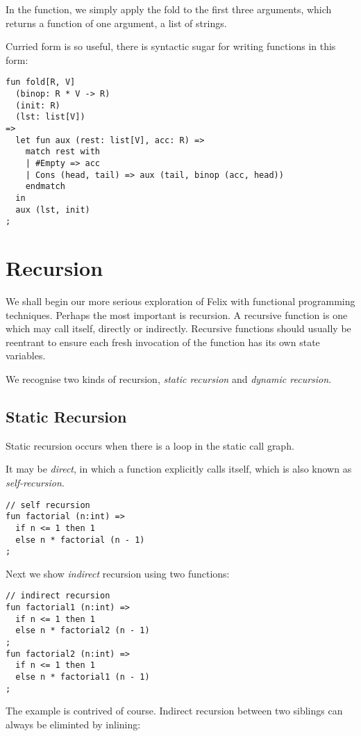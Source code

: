 \documentclass[oneside]{book}
\begin{document}
In the function, we simply apply the fold to the
first three arguments, which returns a function 
of one argument, a list of strings.

Curried form is so useful, there is syntactic sugar
for writing functions in this form:

\begin{verbatim}
fun fold[R, V] 
  (binop: R * V -> R)
  (init: R)
  (lst: list[V])
=>
  let fun aux (rest: list[V], acc: R) =>
    match rest with
    | #Empty => acc
    | Cons (head, tail) => aux (tail, binop (acc, head))
    endmatch
  in 
  aux (lst, init)
;
\end{verbatim}


\chapter{Recursion}
We shall begin our more serious exploration of Felix with functional programming
techniques. Perhaps the most important is recursion. A recursive function
is one which may call itself, directly or indirectly. 
Recursive functions should usually be reentrant to ensure each fresh invocation
of the function has its own state variables.

We recognise two kinds of recursion, {\em static recursion} and
{\em dynamic recursion}.

\section{Static Recursion}
Static recursion occurs when
there is a loop in the static call graph. 

It may be {\em direct}, in which
a function explicitly calls itself, which is also known as {\em self-recursion}.

\begin{verbatim}
// self recursion
fun factorial (n:int) => 
  if n <= 1 then 1
  else n * factorial (n - 1)
;
\end{verbatim}

Next we show {\em indirect} recursion using two functions:

\begin{verbatim}
// indirect recursion
fun factorial1 (n:int) => 
  if n <= 1 then 1
  else n * factorial2 (n - 1)
;
fun factorial2 (n:int) => 
  if n <= 1 then 1
  else n * factorial1 (n - 1)
;
\end{verbatim}

The example is contrived of course. 
Indirect recursion between two siblings can always be eliminted by inlining:
\end{document}
